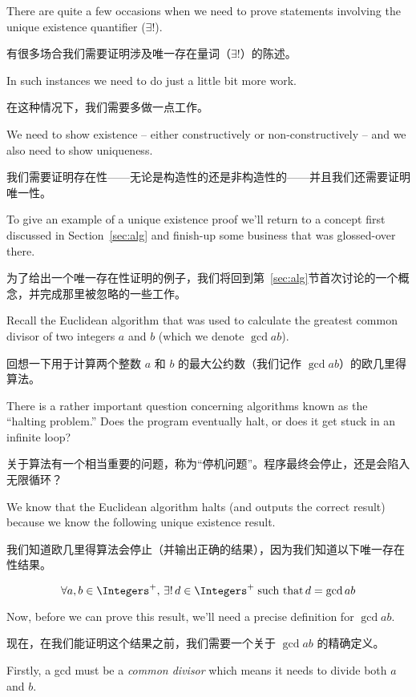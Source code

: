 There are quite a few occasions when we need to prove statements
involving the  unique existence quantifier 
($\exists !$).

有很多场合我们需要证明涉及唯一存在量词（$\exists !$）的陈述。

In
such instances we need to do just a little bit more work.

在这种情况下，我们需要多做一点工作。

We
need to show existence -- either constructively or non-constructively --
and we also need to show uniqueness.

我们需要证明存在性——无论是构造性的还是非构造性的——并且我们还需要证明唯一性。

To give an example of 
a unique existence proof we'll return to a concept first
discussed in Section~\ref{sec:alg} and finish-up some business
that was glossed-over there.

为了给出一个唯一存在性证明的例子，我们将回到第~\ref{sec:alg}节首次讨论的一个概念，并完成那里被忽略的一些工作。

Recall the Euclidean algorithm that was used to calculate the 
greatest
common divisor of two integers $a$ and $b$ (which we denote $\gcd{a}{b}$).

回想一下用于计算两个整数 $a$ 和 $b$ 的最大公约数（我们记作 $\gcd{a}{b}$）的欧几里得算法。

There is a rather important question concerning algorithms known as
the ``halting problem.''  Does the program eventually halt, or does it get 
stuck in an infinite loop?

关于算法有一个相当重要的问题，称为“停机问题”。程序最终会停止，还是会陷入无限循环？

We know that the Euclidean algorithm halts
(and outputs the correct result) because we know the following
unique existence result.

我们知道欧几里得算法会停止（并输出正确的结果），因为我们知道以下唯一存在性结果。

\[ \forall a, b \in \Integers^+, \, \exists ! \, d \in \Integers^+ \; \mbox{such that} \, d=\gcd{a}{b} \]
  
Now, before we can prove this result, we'll need a precise definition
for $\gcd{a}{b}$.

现在，在我们能证明这个结果之前，我们需要一个关于 $\gcd{a}{b}$ 的精确定义。

Firstly, a gcd must be a \emph{common divisor} which
means it needs to divide both $a$ and $b$.

